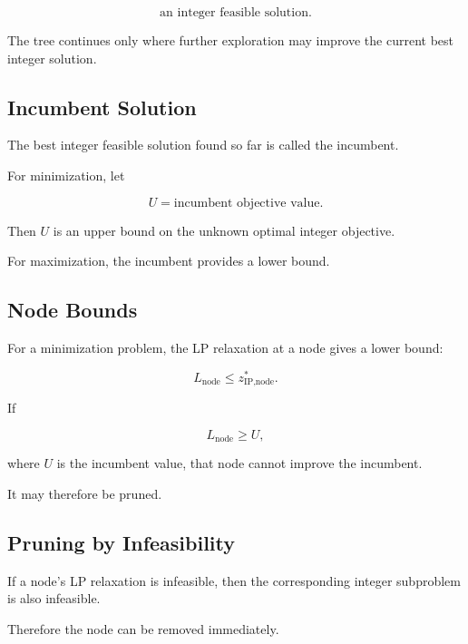 \[
\boxed{
\text{an integer feasible solution}.
}
\]

The tree continues only where further exploration may improve the current
best integer solution.

\subsection{Incumbent Solution}
\label{subsec:integer-incumbent}

The best integer feasible solution found so far is called the incumbent.

For minimization, let

\[
\boxed{
U
=
\text{incumbent objective value}.
}
\]

Then \(U\) is an upper bound on the unknown optimal integer objective.

For maximization, the incumbent provides a lower bound.

\subsection{Node Bounds}
\label{subsec:integer-node-bounds}

For a minimization problem, the LP relaxation at a node gives a lower
bound:

\[
\boxed{
L_{\text{node}}
\leq
z_{\text{IP,node}}^*.
}
\]

If

\[
L_{\text{node}}
\geq
U,
\]

where \(U\) is the incumbent value, that node cannot improve the incumbent.

It may therefore be pruned.

\subsection{Pruning by Infeasibility}
\label{subsec:pruning-infeasibility}

If a node's LP relaxation is infeasible, then the corresponding integer
subproblem is also infeasible.

Therefore the node can be removed immediately.

